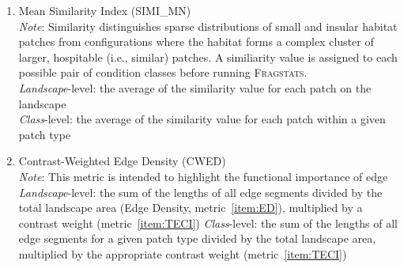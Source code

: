 \begin{enumerate}
	\item Mean Similarity Index (SIMI\_MN)\\
	\emph{Note}: Similarity distinguishes sparse distributions of small and insular habitat patches from configurations where the habitat forms a complex cluster of larger, hospitable (i.e., similar) patches. A similiarity value is assigned to each possible pair of condition classes before running \textsc{Fragstats}. 	\\
	\emph{Landscape}-level: the average of the similarity value for each patch on the landscape \\
	\emph{Class}-level: the average of the similarity value for each patch within a given patch type \\
	
	\item Contrast-Weighted Edge Density (CWED)\\
	\emph{Note}: This metric is intended to highlight the functional importance of edge	\\
	\emph{Landscape}-level: the sum of the lengths of all edge segments divided by the total landscape area (Edge Density, metric~\ref{item:ED}), multiplied by a contrast weight (metric~\ref{item:TECI})
	\emph{Class}-level: the sum of the lengths of all edge segments for a given patch type divided by the total landscape area, multiplied by the appropriate contrast weight (metric~\ref{item:TECI})  	\\


\end{enumerate}
